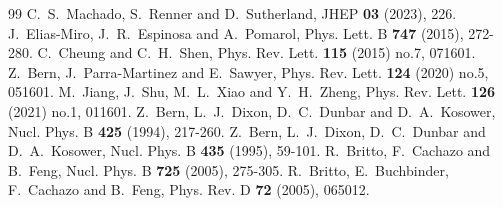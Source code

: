 \documentclass[prl,twocolumn,twoside,preprintnumbers,superscriptaddress, nofootinbib]{revtex4-2}
\begin{document}
\begin{thebibliography}{99}
C.~S.~Machado, S.~Renner and D.~Sutherland,
JHEP \textbf{03} (2023), 226.
%
J.~Elias-Miro, J.~R.~Espinosa and A.~Pomarol,
Phys. Lett. B \textbf{747} (2015), 272-280.
%
C.~Cheung and C.~H.~Shen,
Phys. Rev. Lett. \textbf{115} (2015) no.7, 071601.
%
Z.~Bern, J.~Parra-Martinez and E.~Sawyer,
Phys. Rev. Lett. \textbf{124} (2020) no.5, 051601.
%
M.~Jiang, J.~Shu, M.~L.~Xiao and Y.~H.~Zheng,
Phys. Rev. Lett. \textbf{126} (2021) no.1, 011601.
%
Z.~Bern, L.~J.~Dixon, D.~C.~Dunbar and D.~A.~Kosower,
Nucl. Phys. B \textbf{425} (1994), 217-260.
%
Z.~Bern, L.~J.~Dixon, D.~C.~Dunbar and D.~A.~Kosower,
Nucl. Phys. B \textbf{435} (1995), 59-101.
%
R.~Britto, F.~Cachazo and B.~Feng,
Nucl. Phys. B \textbf{725} (2005), 275-305.
%
R.~Britto, E.~Buchbinder, F.~Cachazo and B.~Feng,
Phys. Rev. D \textbf{72} (2005), 065012.

\end{thebibliography}
\end{document}
